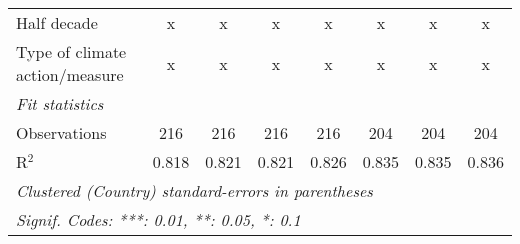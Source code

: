 \begin{tabular}{lccccccc}
   Half decade                                                                                   & x            & x           & x            & x           & x           & x           & x\\  
   Type of climate action/measure                                                                & x            & x           & x            & x           & x           & x           & x\\  
   \midrule \emph{Fit statistics}\\
   Observations                                                                                  & 216          & 216         & 216          & 216         & 204         & 204         & 204\\  
   R$^2$                                                                                         & 0.818        & 0.821       & 0.821        & 0.826       & 0.835       & 0.835       & 0.836\\  
   \midrule
   \multicolumn{8}{l}{\emph{Clustered (Country) standard-errors in parentheses}}\\
   \multicolumn{8}{l}{\emph{Signif. Codes: ***: 0.01, **: 0.05, *: 0.1}}\\
\end{tabular}
\par\endgroup


